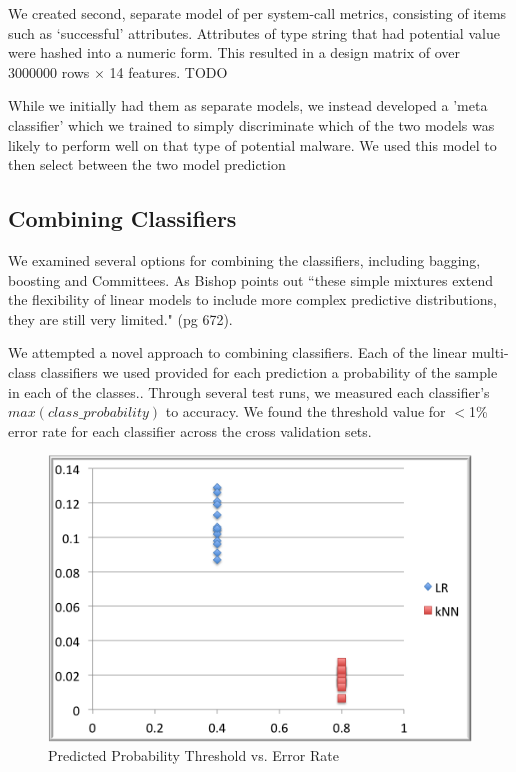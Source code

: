 \documentclass[11pt, oneside]{article}   	%
\begin{document}
We created second, separate model of per system-call metrics, consisting of items such as `successful' attributes. Attributes of type string that had potential value were hashed into a numeric form. This resulted in a design matrix of over 
3000000 rows $\times$ 14 features. TODO

While we initially had them as separate models, we instead developed a 'meta classifier' which we trained to simply discriminate which of the two models was likely to perform well on that type of potential malware. We used this model to then select between the two model prediction

\subsection*{Combining Classifiers}

We examined several options for combining the classifiers, including bagging, boosting and Committees. As Bishop points out ``these simple mixtures extend the flexibility of linear models to include more complex predictive distributions, they are still very limited." (pg 672).

We attempted a novel approach to combining classifiers. Each of the linear multi-class classifiers we used provided for each prediction a probability of the sample in each of the classes.\cite{sklearn}. Through several test runs, we measured each classifier's $max(class\_probability)$ to accuracy. We found the threshold value for $<$1\% error rate for each classifier across the cross validation sets. 

\begin{figure}[h!] 
  \centering
  \includegraphics[scale=0.5]{accuracy}
  \caption{Predicted Probability Threshold vs. Error Rate}
\end{figure}
\end{document}
